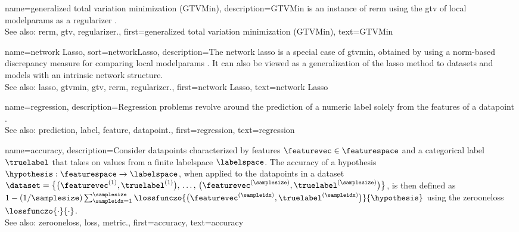 {name={generalized total variation minimization (GTVMin)},
	description={GTVMin is an instance of \gls{rerm} 
		using the \gls{gtv} of local \glspl{modelparam} as a \gls{regularizer} \cite{ClusteredFLTVMinTSP}.
					\\ 
		See also: \gls{rerm}, \gls{gtv}, \gls{regularizer}.},
	first={generalized total variation minimization (GTVMin)},
	text={GTVMin} 
}

{name={network Lasso},
sort={networkLasso},
	description={The network \gls{lasso} is a special case of 
		\gls{gtvmin}, obtained by using a \gls{norm}-based \gls{discrepancy} 
		\gls{measure} for comparing local \glspl{modelparam} \cite{NetworkLasso}. 
		It can also be viewed as a \gls{generalization} of the \gls{lasso} 
		method to \glspl{dataset} and \glspl{model} with an intrinsic network 
		structure.
			\\
		See also: \gls{lasso}, \gls{gtvmin}, \gls{gtv}, \gls{rerm}, \gls{regularizer}.},
	first={network Lasso},
	text={network Lasso}
}

{name={regression},
	description={Regression problems revolve around the 
		\gls{prediction} of a numeric \gls{label} solely from the \glspl{feature} of a \gls{datapoint} \cite[Ch. 2]{MLBasics}.
					\\ 
		See also: \gls{prediction}, \gls{label}, \gls{feature}, \gls{datapoint}.},
	first={regression},
	text={regression} 
}

{name={accuracy},
	description={Consider \glspl{datapoint} characterized by \glspl{feature} $\featurevec \in \featurespace$ and 
		a categorical \gls{label} $\truelabel$ that takes on values from a finite \gls{labelspace} $\labelspace$. The 
		accuracy of a \gls{hypothesis} $\hypothesis: \featurespace \rightarrow \labelspace$, when applied to the \glspl{datapoint} in a \gls{dataset} 
		$\dataset = \big\{ \big(\featurevec^{(1)}, \truelabel^{(1)} \big), \,\ldots, \,\big(\featurevec^{(\samplesize)},\truelabel^{(\samplesize)}\big) \big\}$, 
		is then defined as $1 - (1/\samplesize)\sum_{\sampleidx=1}^{\samplesize} \lossfunczo{\big(\featurevec^{(\sampleidx)},\truelabel^{(\sampleidx)}\big)}{\hypothesis}$ 
		using the \gls{zerooneloss} $\lossfunczo{\cdot}{\cdot}$.
					\\ 
		See also: \gls{zerooneloss}, \gls{loss}, \gls{metric}.},
	first={accuracy},
	text={accuracy} 
}

